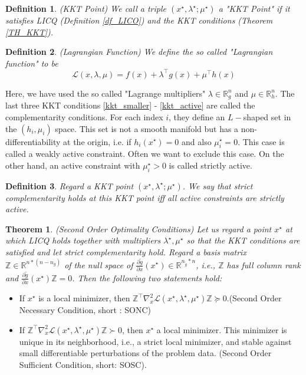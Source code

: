 \documentclass  [
  paper    = a4,
  BCOR     = 10mm,
  twoside,
  fontsize = 12pt,
  fleqn,
  toc      = bibnumbered,
  toc      = listofnumbered,
  numbers  = noendperiod,
  headings = normal,
  listof   = leveldown,
  version  = 3.03
]                                       {scrreprt}
\newcommand{\<}{\langle}
\renewcommand{\>}{\rangle}
\newtheorem{theorem}{Theorem}
\newtheorem{definition}{Definition}
\begin{document}
\begin{definition}(KKT Point)
	We call a triple $(x^\star, \lambda^\star; \mu^\star)$ a "KKT Point" if it satisfies LICQ  (Definition \ref{df_LICO}) and the KKT conditions (Theorem \ref{TH_KKT}).
\end{definition}
\begin{definition}(Lagrangian Function)
	We define the so called "Lagrangian function" to be
	\begin{equation}
		\mathcal{L}(x,\lambda, \mu) = f(x) + \lambda^\top g(x) +  \mu^\top h(x) 
		\label{eq_Lagrangian}
	\end{equation}
\end{definition}
Here, we have used the so called "Lagrange multipliers" $\lambda \in \mathbb{R}^n_g$ and $\mu \in \mathbb{R}^n_h$. 
The last three KKT conditions \ref{kkt_smaller} - \ref{kkt_active} are called the complementarity conditions. For each index $i$, they define an $L-$shaped set in the $(h_i, \mu_i)$ space. This set is not a smooth manifold but has a non-differentiability at the origin, i.e.   if  $h_i(x^\star)=0$ and also $\mu_i^\star = 0$. This case is called a weakly active constraint. Often we want to exclude this case. On the other hand, an active constraint with $\mu_i^\star > 0$ is called strictly active.
\begin{definition}
	Regard a KKT point $(x^\star, \lambda^\star; \mu^\star)$. We say that strict complementarity holds at this KKT point iff all	active constraints are strictly active.
\end{definition}

\begin{theorem}(Second Order Optimality Conditions) Let us regard a point $x^\star$ at which LICQ holds together with
	multipliers $\lambda^\star, \mu^\star$ so that the KKT conditions are satisfied and let strict complementarity hold. Regard a basis matrix $\mathbb{Z} \in  \mathbb{R}^{n*(n-n_g)}$ of the null space of $\frac{\partial \tilde{g}}{\partial x} (x^\star) \in \mathbb{R}^{n_{\tilde{g}} *n}$, i.e., $\mathbb{Z}$ has full column rank and $\frac{\partial \tilde{g}}{\partial x} (x^\star)\mathbb{Z} =0$. Then the following two statements hold:
\end{theorem}
\begin{itemize}
	\item  If $x^\star$ is a local minimizer, then $\mathbb{Z}^\top \nabla_x^2 \mathcal{L}(x^\star, \lambda^\star, \mu^\star)\mathbb{Z} \succeq 0  $.(Second Order Necessary Condition, short : SONC)
	\item  If $\mathbb{Z}^\top \nabla_x^2 \mathcal{L}(x^\star, \lambda^\star, \mu^\star)\mathbb{Z} \succ 0 $, then $x^\star$ a local minimizer. This minimizer is unique in its neighborhood, i.e., a strict local minimizer, and stable against small differentiable perturbations of the problem data. (Second Order Sufficient Condition, short: SOSC).
\end{itemize}
\end{document}
